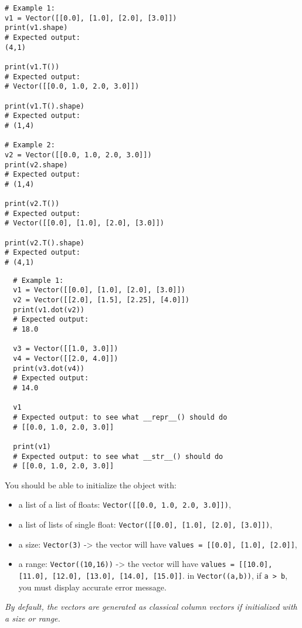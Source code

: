\begin{verbatim}
# Example 1:
v1 = Vector([[0.0], [1.0], [2.0], [3.0]])
print(v1.shape)
# Expected output:
(4,1)

print(v1.T())
# Expected output:
# Vector([[0.0, 1.0, 2.0, 3.0]])

print(v1.T().shape)
# Expected output:
# (1,4)

# Example 2:
v2 = Vector([[0.0, 1.0, 2.0, 3.0]])
print(v2.shape)
# Expected output:
# (1,4)

print(v2.T())
# Expected output:
# Vector([[0.0], [1.0], [2.0], [3.0]])

print(v2.T().shape)
# Expected output:
# (4,1)
\end{verbatim}

\begin{verbatim}
  # Example 1:
  v1 = Vector([[0.0], [1.0], [2.0], [3.0]])
  v2 = Vector([[2.0], [1.5], [2.25], [4.0]])
  print(v1.dot(v2))
  # Expected output:
  # 18.0

  v3 = Vector([[1.0, 3.0]])
  v4 = Vector([[2.0, 4.0]])
  print(v3.dot(v4))
  # Expected output:
  # 14.0

  v1
  # Expected output: to see what __repr__() should do
  # [[0.0, 1.0, 2.0, 3.0]]

  print(v1)
  # Expected output: to see what __str__() should do
  # [[0.0, 1.0, 2.0, 3.0]]
\end{verbatim}

You should be able to initialize the object with:
\begin{itemize}
  \item a list of a list of floats: \texttt{Vector([[0.0, 1.0, 2.0, 3.0]])},
  \item a list of lists of single float: \texttt{Vector([[0.0], [1.0], [2.0], [3.0]])},
  \item a size: \texttt{Vector(3)} -> the vector will have \texttt{values = [[0.0], [1.0], [2.0]]},
  \item a range: \texttt{Vector((10,16))} -> the vector will have \texttt{values = [[10.0], [11.0], [12.0], [13.0], [14.0], [15.0]]}.
    in \texttt{Vector((a,b))}, if \texttt{a > b}, you must display accurate error message.
\end{itemize}

\textit{By default, the vectors are generated as classical column vectors if initialized with a size or range.}

